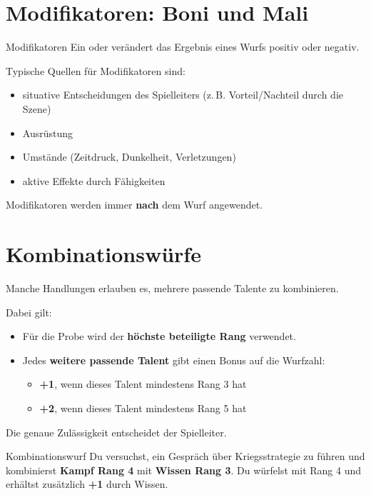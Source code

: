 \section{Modifikatoren: Boni und Mali}

\begin{rulebox}{Modifikatoren}
	Ein  oder  verändert das Ergebnis eines Wurfs positiv oder negativ.
\end{rulebox}

Typische Quellen für Modifikatoren sind:
\begin{itemize}
	\item situative Entscheidungen des Spielleiters (z.\,B. Vorteil/Nachteil durch die Szene)
	\item Ausrüstung
	\item Umstände (Zeitdruck, Dunkelheit, Verletzungen)
	\item aktive Effekte durch Fähigkeiten
\end{itemize}

Modifikatoren werden immer \textbf{nach} dem Wurf angewendet.


\section{Kombinationswürfe}

\begin{rulebox}{}
	Manche Handlungen erlauben es, mehrere passende Talente zu kombinieren.
\end{rulebox}

Dabei gilt:
\begin{itemize}
	\item Für die Probe wird der \textbf{höchste beteiligte Rang} verwendet.
	\item Jedes \textbf{weitere passende Talent} gibt einen Bonus auf die Wurfzahl:
	\begin{itemize}
		\item \textbf{+1}, wenn dieses Talent mindestens Rang 3 hat
		\item \textbf{+2}, wenn dieses Talent mindestens Rang 5 hat
	\end{itemize}
\end{itemize}

Die genaue Zulässigkeit entscheidet der Spielleiter.

\begin{examplebox}{Kombinationswurf}
	Du versuchst, ein Gespräch über Kriegsstrategie zu führen und kombinierst
	\textbf{Kampf Rang 4} mit \textbf{Wissen Rang 3}.
	Du würfelst mit Rang 4 und erhältst zusätzlich \textbf{+1} durch Wissen.
\end{examplebox}


